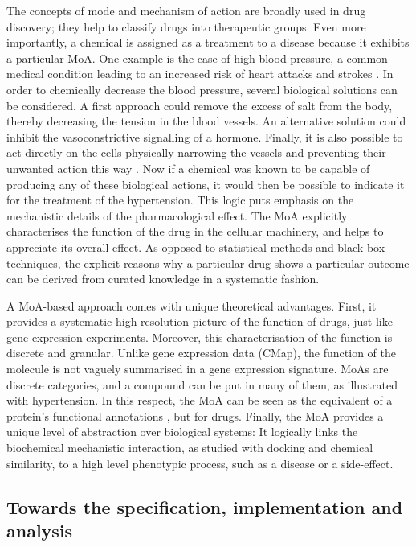 The concepts of mode and mechanism of action are broadly used in drug discovery; they help to classify drugs into therapeutic groups. Even more importantly, a chemical is assigned as a treatment to a disease because it exhibits a particular MoA. One example is the case of high blood pressure, a common medical condition leading to an increased risk of heart attacks and strokes \citep{hypertensionnhs}. In order to chemically decrease the blood pressure, several biological solutions can be considered. A first approach could remove the excess of salt from the body, thereby decreasing the tension in the blood vessels. An alternative solution could inhibit the vasoconstrictive signalling of a hormone. Finally, it is also possible to act directly on the cells physically narrowing the vessels and preventing their unwanted action this way \citep{ong2007prevalence}. Now if a chemical was known to be capable of producing any of these biological actions, it would then be possible to indicate it for the treatment of the hypertension. This logic puts emphasis on the mechanistic details of the pharmacological effect. The MoA explicitly characterises the function of the drug in the cellular machinery, and helps to appreciate its overall effect. As opposed to statistical methods and black box techniques, the explicit reasons why a particular drug shows a particular outcome can be derived from curated knowledge in a systematic fashion.

A MoA-based approach comes with unique theoretical advantages. First, it provides a systematic high-resolution picture of the function of drugs, just like gene expression experiments. Moreover, this characterisation of the function is discrete and granular. Unlike gene expression data (CMap), the function of the molecule is not vaguely summarised in a gene expression signature. MoAs are discrete categories, and a compound can be put in many of them, as illustrated with hypertension. In this respect, the MoA can be seen as the equivalent of a protein’s functional annotations \citep{ashburner2000gene}, but for drugs. Finally, the MoA provides a unique level of abstraction over biological systems: It logically links the biochemical mechanistic interaction, as studied with docking and chemical similarity, to a high level phenotypic process, such as a disease or a side-effect.

\subsection{Towards the specification, implementation and analysis}

